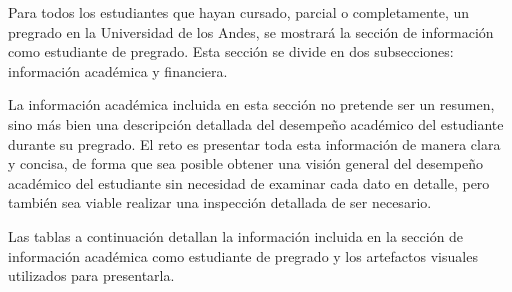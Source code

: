 Para todos los estudiantes que hayan cursado, parcial o completamente, un pregrado en la Universidad de los Andes, se mostrará la sección de información como estudiante de pregrado. Esta sección se divide en dos subsecciones: información académica y financiera.

La información académica incluida en esta sección no pretende ser un resumen, sino más bien una descripción detallada del desempeño académico del estudiante durante su pregrado. El reto es presentar toda esta información de manera clara y concisa, de forma que sea posible obtener una visión general del desempeño académico del estudiante sin necesidad de examinar cada dato en detalle, pero también sea viable realizar una inspección detallada de ser necesario.

Las tablas a continuación detallan la información incluida en la sección de información académica como estudiante de pregrado y los artefactos visuales utilizados para presentarla.

